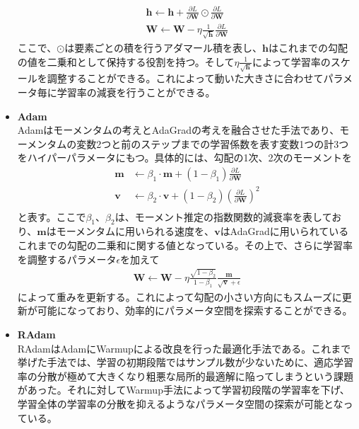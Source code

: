 \begin{itemize}
\begin{align}
\bm{h} \leftarrow \bm{h} + \frac{\partial L}{\partial \bm{W}} \odot \frac{\partial L}{\partial \bm{W}} \\
\bm{W} \leftarrow \bm{W} - \eta \frac{1}{\sqrt{\bm{h}}} \frac{\partial L}{\partial \bm{W}}
\end{align}
ここで、$\odot$は要素ごとの積を行うアダマール積を表し、$\bm{h}$はこれまでの勾配の値を二乗和として保持する役割を持つ。そして$\eta \frac{1}{\sqrt{\bm{h}}}$によって学習率のスケールを調整することができる。これによって動いた大きさに合わせてパラメータ毎に学習率の減衰を行うことができる。
\item \textbf{Adam}\\
Adam\cite{adam}はモーメンタムの考えとAdaGradの考えを融合させた手法であり、モーメンタムの変数2つと前のステップまでの学習係数を表す変数1つの計3つをハイパーパラメータにもつ。具体的には、勾配の1次、2次のモーメントを
\begin{align}
\bm{m} &\leftarrow \beta_1 \cdot \bm{m} +  (1 - \beta_1) \frac{\partial L}{\partial \bm{W}} \\
\bm{v} &\leftarrow \beta_2 \cdot \bm{v} +  (1 - \beta_2) {\left( \frac{\partial L}{\partial \bm{W}} \right) }^2 \\
\end{align}
と表す。ここで$\beta_1$、$\beta_2$は、モーメント推定の指数関数的減衰率を表しており、$\bm{m}$はモーメンタムに用いられる速度を、$\bm{v}$はAdaGradに用いられているこれまでの勾配の二乗和に関する値となっている。その上で、さらに学習率を調整するパラメータ$\epsilon$を加えて
\begin{align}
\bm{W} \leftarrow \bm{W} - \eta \frac{\sqrt{1-\beta_2}}{1-\beta_1} \frac{\bm{m}}{\sqrt{\bm{v}} + \epsilon}
\end{align}
によって重みを更新する。これによって勾配の小さい方向にもスムーズに更新が可能になっており、効率的にパラメータ空間を探索することができる。
\item \textbf{RAdam}\\
RAdam\cite{radam}はAdamにWarmupによる改良を行った最適化手法である。これまで挙げた手法では、学習の初期段階ではサンプル数が少ないために、適応学習率の分散が極めて大きくなり粗悪な局所的最適解に陥ってしまうという課題があった。それに対してWarmup手法によって学習初段階の学習率を下げ、学習全体の学習率の分散を抑えるようなパラメータ空間の探索が可能となっている。
\end{itemize}
